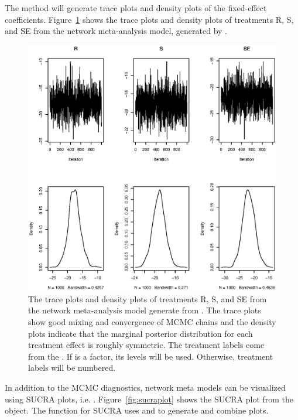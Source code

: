 The  method will generate trace plots and density plots of the fixed-effect coefficients. Figure~\ref{fig:nmr-traceplot} shows the trace plots and density plots of treatments R, S, and SE from the network meta-analysis model, generated by .

\begin{figure}[H]
  \centering
  \includegraphics[scale=0.7]{nma_traceplots.eps}
  \caption{The trace plots and density plots of treatments R, S, and SE from the network meta-analysis model generate from . The trace plots show good mixing and convergence of MCMC chains and the density plots indicate that the marginal posterior distribution for each treatment effect is roughly symmetric. The treatment labels come from the . If  is a factor, its levels will be used. Otherwise, treatment labels will be numbered.}
  \label{fig:nmr-traceplot}
\end{figure}
In addition to the MCMC diagnostics, network meta models can be visualized using SUCRA plots, i.e. . Figure~\ref{fig:sucraplot} shows the SUCRA plot from the  object. The  function for SUCRA uses  \citep{ggplot22016} and  \citep{gridExtra2017} to generate and combine plots.
